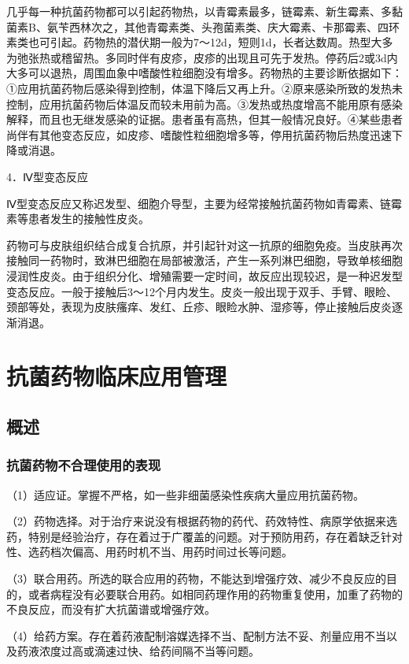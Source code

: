 几乎每一种抗菌药物都可以引起药物热，以青霉素最多，链霉素、新生霉素、多黏菌素B、氨苄西林次之，其他青霉素类、头孢菌素类、庆大霉素、卡那霉素、四环素类也可引起。药物热的潜伏期一般为7～12d，短则1d，长者达数周。热型大多为弛张热或稽留热。多同时伴有皮疹，皮疹的出现且可先于发热。停药后2或3d内大多可以退热，周围血象中嗜酸性粒细胞没有增多。药物热的主要诊断依据如下：①应用抗菌药物后感染得到控制，体温下降后又再上升。②原来感染所致的发热未控制，应用抗菌药物后体温反而较未用前为高。③发热或热度增高不能用原有感染解释，而且也无继发感染的证据。患者虽有高热，但其一般情况良好。④某些患者尚伴有其他变态反应，如皮疹、嗜酸性粒细胞增多等，停用抗菌药物后热度迅速下降或消退。

4．Ⅳ型变态反应

Ⅳ型变态反应又称迟发型、细胞介导型，主要为经常接触抗菌药物如青霉素、链霉素等患者发生的接触性皮炎。

药物可与皮肤组织结合成复合抗原，并引起针对这一抗原的细胞免疫。当皮肤再次接触同一药物时，致淋巴细胞在局部被激活，产生一系列淋巴细胞，导致单核细胞浸润性皮炎。由于组织分化、增殖需要一定时间，故反应出现较迟，是一种迟发型变态反应。一般于接触后3～12个月内发生。皮炎一般出现于双手、手臂、眼睑、颈部等处，表现为皮肤瘙痒、发红、丘疹、眼睑水肿、湿疹等，停止接触后皮炎逐渐消退。

\section{抗菌药物临床应用管理}

\subsection{概述}

\subsubsection{抗菌药物不合理使用的表现}

（1）适应证。掌握不严格，如一些非细菌感染性疾病大量应用抗菌药物。

（2）药物选择。对于治疗来说没有根据药物的药代、药效特性、病原学依据来选药，特别是经验治疗，存在着过于广覆盖的问题。对于预防用药，存在着缺乏针对性、选药档次偏高、用药时机不当、用药时间过长等问题。

（3）联合用药。所选的联合应用的药物，不能达到增强疗效、减少不良反应的目的，或者病程没有必要联合用药。如相同药理作用的药物重复使用，加重了药物的不良反应，而没有扩大抗菌谱或增强疗效。

（4）给药方案。存在着药液配制溶媒选择不当、配制方法不妥、剂量应用不当以及药液浓度过高或滴速过快、给药间隔不当等问题。

